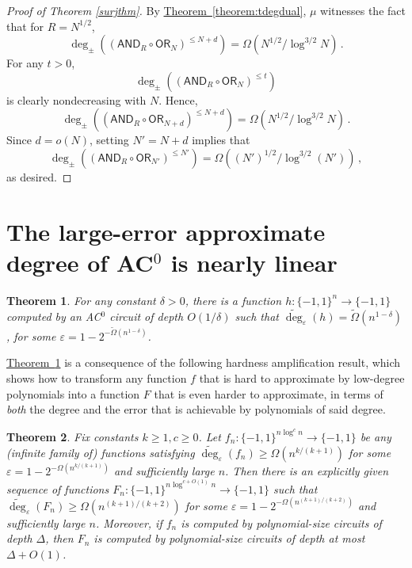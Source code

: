 \documentclass[11pt]{article}
\numberwithin{equation}{section}
\newtheorem{theorem}{Theorem}[section]
\theoremstyle{definition}
\theoremstyle{plain}
\newcommand{\expref}[2]{\hyperref[#2]{#1~\ref{#2}}}
\newcommand{\OR}{\mathsf{ OR}}
\newcommand{\bits}{\{-1,1\}}
\newcommand{\eps}{\varepsilon}
\newcommand{\adeg}{\widetilde{\operatorname{deg}}}
\newcommand{\AND}{\mathsf{AND}}
\begin{document}
\begin{proof}[Proof of Theorem \ref{surjthm}]
	By \expref{Theorem}{theorem:tdegdual}, $\mu$ witnesses the fact that for $R=N^{1/2}$,
%
%
\[\deg_{\pm}\left(\left(\AND_R \circ \OR_N\right)^{\leq N+d}\right) =
\Omega\left(N^{1/2}/\log^{3/2} N\right)\,.\]
For any $t > 0$,
%
\[ \deg_{\pm}\left(\left(\AND_R \circ \OR_N\right)^{\leq t}\right) \]
is clearly nondecreasing with $N$. Hence, 
%
%
\[ \deg_{\pm}\left(\left(\AND_R \circ \OR_{N+d}\right)^{\leq N+d}\right) = \Omega\left(N^{1/2}/\log^{3/2} N\right) \,.\]
Since $d=o(N)$, setting $N'=N+d$ implies that
%
%
\[ \deg_{\pm}\left(\left(\AND_R \circ \OR_{N'}\right)^{\leq N'}\right)
 = \Omega\left((N')^{1/2}/\log^{3/2}(N')\right)\,,\]
as desired.  %
\end{proof}


\section{The large-error approximate degree of
  \texorpdfstring{AC$^0$}{AC0} is nearly linear}
\label{s:discproof}
\begin{theorem} \label{ac0thm}
	For any constant $\delta > 0$, there is a function $h \colon \bits^n \to \bits$ computed
	by an AC$^0$ circuit of depth $O(1/\delta)$ such that $\adeg_{\eps}(h) = \tilde{\Omega}(n^{1-\delta})$,
	for some $\eps=1-2^{-\tilde{\Omega}(n^{1-\delta})}$. 
\end{theorem}

\expref{Theorem}{ac0thm} is a consequence of the following hardness amplification result, which
shows how to transform any function $f$ that is hard to approximate by low-degree polynomials
into a function $F$ that is even harder to approximate, in terms of \emph{both} the degree
and the error that is achievable by polynomials of said degree.

\begin{theorem} \label{hardnessamp}
	Fix constants $k\geq 1, c \ge 0$. Let $f_n \colon \bits^{n\log^c n} \to \bits$ be any (infinite family of) functions satisfying $\adeg_{\eps}(f_n) \geq \Omega\left(n^{k/(k+1)}\right)$
	for some $\eps=1-2^{-\Omega(n^{k/(k+1)})}$ and sufficiently large $n$. Then there is an explicitly given sequence of functions
	$F_n \colon \bits^{n \log^{c+O(1)}n} \to \bits$ such that 
	$\adeg_{\eps}(F_n) \geq \Omega\left(n^{(k+1)/(k+2)}\right)$
	for some $\eps=1-2^{-\Omega\left(n^{(k+1)/(k+2)}\right)}$ and sufficiently large $n$. Moreover,
	if $f_n$ is computed by polynomial-size %
circuits of depth %
$\Delta$, then $F_n$ is computed by 
polynomial-size %
circuits of depth at most $\Delta+O(1)$. 
\end{theorem}
\end{document}
